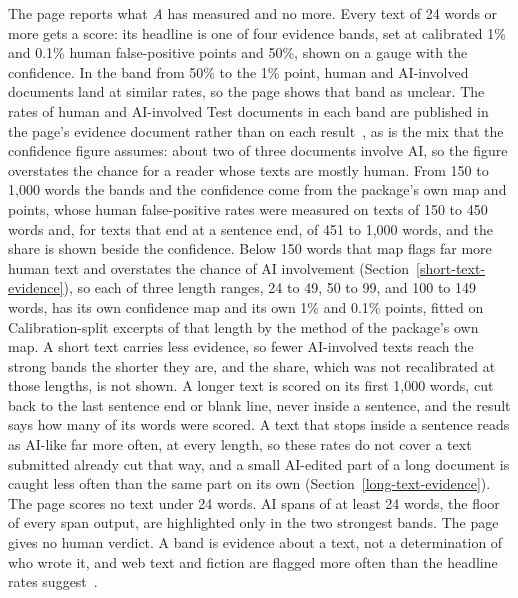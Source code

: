 The page reports what \textit{A} has measured and no more. Every text of 24
words or more gets a score: its headline is one of four evidence bands, set at
calibrated 1\% and 0.1\% human false-positive points and 50\%, shown on a gauge
with the confidence. In the band from 50\% to the 1\% point, human and
AI-involved documents land at similar rates, so the page shows that band as
unclear. The rates of human and AI-involved Test documents in each band are
published in the page's evidence document rather than on each
result~\cite{detectevidence}, as is the mix that the confidence figure assumes:
about two of three documents involve AI, so the figure overstates the chance
for a reader whose texts are mostly human. From 150 to 1,000 words the bands
and the confidence come from the package's own map and points, whose human
false-positive rates were measured on texts of 150 to 450 words and, for texts
that end at a sentence end, of 451 to 1,000 words, and the share is shown
beside the confidence. Below 150 words that map flags far more human text and
overstates the chance of AI involvement (Section~\ref{short-text-evidence}), so
each of three length ranges, 24 to 49, 50 to 99, and 100 to 149 words, has its
own confidence map and its own 1\% and 0.1\% points, fitted on
Calibration-split excerpts of that length by the method of the package's own
map. A short text carries less evidence, so fewer AI-involved texts reach the
strong bands the shorter they are, and the share, which was not recalibrated at
those lengths, is not shown. A longer text is scored on its first 1,000 words,
cut back to the last sentence end or blank line, never inside a sentence, and
the result says how many of its words were scored. A text that stops inside a
sentence reads as AI-like far more often, at every length, so these rates do
not cover a text submitted already cut that way, and a small AI-edited part of
a long document is caught less often than the same part on its own
(Section~\ref{long-text-evidence}). The page scores no text under 24 words.
AI spans of at least 24 words, the floor of every span output, are highlighted
only in the two strongest bands. The page gives no human verdict. A band is
evidence about a text, not a determination of who wrote it, and web text and
fiction are flagged more often than the headline rates
suggest~\cite{detectevidence}.

